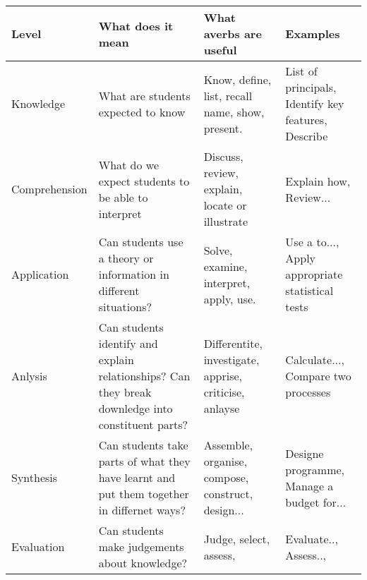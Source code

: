 \documentclass[12pt, a4paper, oneside]{article}\usepackage[]{graphicx}\usepackage[]{color}
\begin{document}
\begin{center}
\begin{tabular}{l | p{3cm}|p{3cm}| p{3cm}}
Level & What does it mean & What averbs are useful & Examples\\
\hline
Knowledge & What are students expected to know & Know, define, list, recall name, show, present.   & List of principals, Identify key features, Describe\\
Comprehension & What do we expect students to be able to interpret & Discuss, review, explain, locate or illustrate & Explain how, Review...\\
Application & Can students use a theory or information in different situations? & Solve, examine, interpret, apply, use. & Use a to..., Apply appropriate statistical tests\\
Anlysis & Can students identify and explain relationships?  Can they break downledge into constituent parts? & Differentite, investigate, apprise, criticise, anlayse & Calculate..., Compare two processes\\
Synthesis & Can students take parts of what they have learnt and put them together in differnet ways? & Assemble, organise, compose, construct, design...& Designe programme, Manage a budget for...\\
Evaluation & Can students make judgements about knowledge? & Judge, select, assess, & Evaluate.., Assess.., \\
\hline

\end{tabular}
\end{center}
\end{document}
